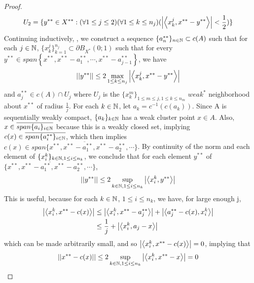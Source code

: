 \begin{thm}
\begin{proof}
\begin{equation}
            U_2=\{y^{**} \in X^{**} : (\forall 1 \leq j \leq 2)(\forall 1 \leq k \leq n_j)(\left| \left\langle x_k^j,x^{**}-y^{**} \right\rangle \right| < \frac{1}{2})\}
        \end{equation}
        Continuing inductively, , we construct a sequence $\{a_n^{**}\}_{n \in \mathbb{N}} \subset c(A)$ such that for each $j \in \mathbb{N}$,  $\{x_k^{j}\}_{k=1}^{n_j} \subset \partial B_{X^*}(0;1)$ such that for every $y^{**} \in span\left\{x^{**},x^{**}-a_1^{**}, \cdots, x^{**}-a_{j-1}^{**}\right\}$, we have 
        \begin{equation}
            \left|\left| y^{**} \right|\right| \leq 2  \max\limits_{1 \leq k \leq n_j} \left| \left\langle x_k^j,x^{**}-y^{**} \right\rangle \right|
        \end{equation}
        and  $a_j^{**}\in c(A) \cap U_j$ where $U_j$ is the $\{x_k^{m}\}_{1 \leq m \leq j,1 \leq k \leq n_m}$ $weak^*$ neighborhood about $x^{**}$ of radius $\frac{1}{j}$.
        For each $k \in \mathbb{N}$, let $a_k=c^{-1}(c(a_k))$. Since A is sequentially weakly compact, $\{a_k\}_{k \in \mathbb{N}}$ has a weak cluster point $x \in A$. 
        Also, $x \in \overline{span\{a_i\}_{i \in \mathbb{N}}}$ because this is a weakly closed set, implying 
        $c(x) \in \overline{span\{a_i^{**}\}_{i \in \mathbb{N}}}$, which then implies 
        $c(x) \in \overline{span\{x^{**},x^{**}-a_1^{**},x^{**}-a_2^{**},\cdots\}}$. 
        By continuity of the norm and each element of $\{x_i^k\}_{k \in \mathbb{N}, 1 \leq i \leq n_k}$, we conclude that for each element $y^{**}$ of 
        $\overline{\{x^{**},x^{**}-a_1^{**},x^{**}-a_2^{**},\cdots\}}$, 
        \begin{equation}
            \left|\left| y^{**} \right|\right| \leq 2 \sup\limits_{k \in \mathbb{N}, 1 \leq i \leq n_k} \left| \left\langle x_i^k,y^{**} \right\rangle \right| 
        \end{equation}
        This is useful, because for each $k \in \mathbb{N}$, $1 \leq i \leq n_k$, we have, for large enough j,
        \begin{equation}
            \begin{split}
                \left| \left\langle x_i^k, x^{**}-c(x) \right\rangle \right| & \leq \left| \left\langle x_i^k,x^{**}-a_j^{**} \right\rangle \right| + \left| \left\langle a_j^{**}-c(x),x_i^k \right\rangle \right|\\
                & \leq \frac{1}{j}+ \left|  \left\langle x_i^k, a_j-x \right\rangle \right|
            \end{split}
        \end{equation}
        which can be made arbitrarily small, and so $\left| \left\langle x_i^k,x^{**}-c(x) \right\rangle \right|=0$, implying that 
        \begin{equation}
            \norm{x^{**}-c(x)} \leq 2 \sup\limits_{k \in \N, 1 \leq i \leq n_k} \abs{\ip{x_i^k,x^{**}-x}}=0

\end{equation}
\end{proof}
\end{thm}
